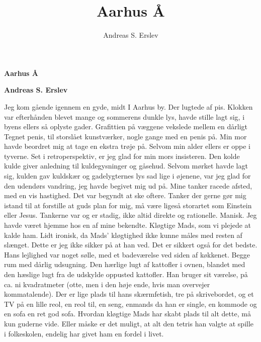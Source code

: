 \documentclass[]{article}
\title{Aarhus Å}
\author{Andreas S. Erslev}
\begin{document}
	
	\begin{center}
		\Large\textbf{Aarhus Å}
	\end{center}
	
	\begin{center}
		\large\textbf{Andreas S. Erslev}
	\end{center}
	
	Jeg kom gående igennem en gyde, midt I Aarhus by. Der lugtede af pis.
	Klokken var efterhånden blevet mange og sommerens dunkle lys, havde stille
	lagt sig, i byens ellers så oplyste gader. Grafittien på væggene vekslede mellem
	en dårligt Tegnet penis, til storslået kunstværker, nogle gange med en penis på.
	Min mor havde beordret mig at tage en ekstra trøje på. Selvom min alder ellers
	er oppe i tyverne. Set i retroperspektiv, er jeg glad for min mors insisteren.
	Den kolde kulde giver anledning til kuldegysninger og gåsehud.
	\newline
	\newline
	Selvom mørket havde lagt sig, kulden gav kuldskær og gadelygternes lys sad
	lige i øjenene, var jeg glad for den udendørs vandring, jeg havde begivet mig ud
	på. Mine tanker racede afsted, med en vis hastighed. Det var begyndt at ske
	oftere. Tanker der gerne gør mig istand til at forstille at guds plan for mig, må
	være ligeså storartet som Einstein eller Jesus. Tankerne var og er stadig, ikke
	altid direkte og rationelle. Manisk.
	\newline
	\newline
	Jeg havde været hjemme hos en af mine bekendte. Kløgtige Mads, som vi
	plejede at kalde ham. Lidt ironisk, da Mads’ kløgtighed ikke kunne måles med
	resten af slænget. Dette er jeg ikke sikker på at han ved. Det er sikkert også
	for det bedste.
	\newline
	\newline
	Hans lejlighed var noget sølle, med et badeværelse ved siden af køkkenet. Begge
	rum med dårlig udsugning. Den hærlige lugt af kattofler i ovnen, blandet med
	den hæslige lugt fra de udskylde oppusted kattofler. Han bruger sit værelse, på
	ca. ni kvadratmeter (otte, men i den høje ende, hvis man overvejer kommatalende). Der er lige plads til hans skærmfetish, tre på skrivebordet, og et TV på en lille reol, en reol til, en seng, enmands da han er single, en kommode og en sofa en ret god sofa. Hvordan kløgtige Mads har skabt plads til alt dette, må kun guderne vide. Eller måske er det muligt, at alt den tetris han valgte at spille i folkeskolen, endelig har givet ham en fordel i livet.
	\newline
\end{document}
